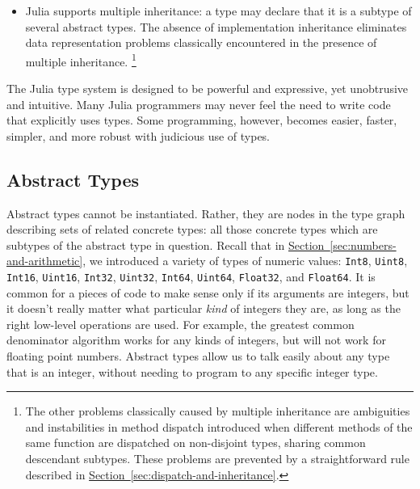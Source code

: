 \documentclass{article}
\renewcommand{\sec}[1]{\label{sec:#1}}
\newcommand{\Section}[1]{\hyperref[sec:#1]{Section~\ref*{sec:#1}}}
\begin{document}
\begin{itemize}
\item Julia supports multiple inheritance:
a type may declare that it is a subtype of several abstract types.
The absence of implementation inheritance eliminates data representation problems classically encountered in the presence of multiple inheritance.%
\footnote{The other problems classically caused by multiple inheritance are ambiguities and instabilities in method dispatch introduced when different methods of the same function are dispatched on non-disjoint types, sharing common descendant subtypes.
These problems are prevented by a straightforward rule described in \Section{dispatch-and-inheritance}.}

\end{itemize}
The Julia type system is designed to be powerful and expressive, yet unobtrusive and intuitive.
Many Julia programmers may never feel the need to write code that explicitly uses types.
Some programming, however, becomes easier, faster, simpler, and more robust with judicious use of types.

\subsection{Abstract Types}\sec{abstract-types}

Abstract types cannot be instantiated.
Rather, they are nodes in the type graph describing sets of related concrete types:
all those concrete types which are subtypes of the abstract type in question.
Recall that in \Section{numbers-and-arithmetic}, we introduced a variety of types of numeric values:
\verb|Int8|, \verb|Uint8|, \verb|Int16|, \verb|Uint16|, \verb|Int32|, \verb|Uint32|, \verb|Int64|, \verb|Uint64|, \verb|Float32|, and \verb|Float64|.
It is common for a pieces of code to make sense only if its arguments are integers, but it doesn't really matter what particular \emph{kind} of integers they are, as long as the right low-level operations are used.
For example, the greatest common denominator algorithm works for any kinds of integers, but will not work for floating point numbers.
Abstract types allow us to talk easily about any type that is an integer, without needing to program to any specific integer type.
\end{document}
